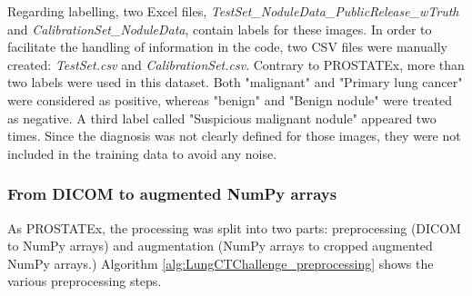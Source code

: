 Regarding labelling, two Excel files, \textit{TestSet\_NoduleData\_PublicRelease\_wTruth} and \textit{CalibrationSet\_NoduleData}, contain labels for these images. In order to facilitate the handling of information in the code, two CSV files were manually created: \mbox{\textit{TestSet.csv}} and \textit{CalibrationSet.csv}.
Contrary to PROSTATEx, more than two labels were used in this dataset. Both "malignant" and "Primary lung cancer" were considered as positive, whereas "benign" and "Benign nodule" were treated as negative. A third label called "Suspicious malignant nodule" appeared two times. Since the diagnosis was not clearly defined for those images, they were not included in the training data to avoid any noise. 


\subsubsection{From DICOM to augmented NumPy arrays}
\setlength{\marginparwidth}{3cm}\leavevmode {}As PROSTATEx, the processing was split into two parts: preprocessing (DICOM to NumPy arrays) and augmentation (NumPy arrays to cropped augmented NumPy arrays.) Algorithm \ref{alg:LungCTChallenge_preprocessing} shows the various preprocessing steps. 

